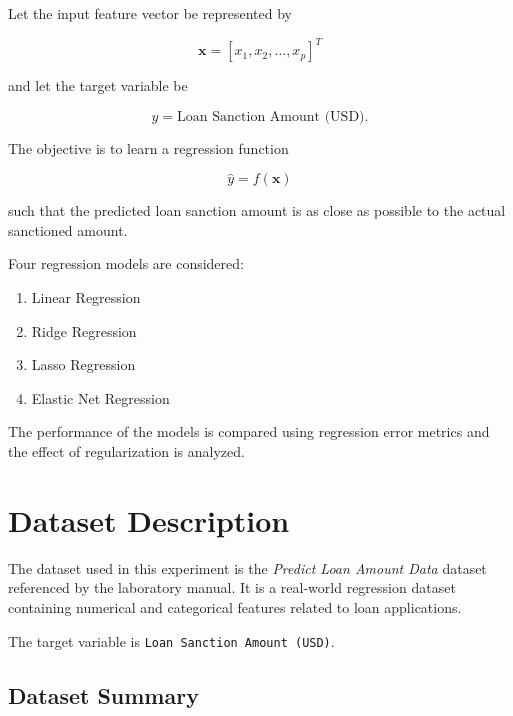 \documentclass[12pt,a4paper]{article}
\begin{document}
Let the input feature vector be represented by

\[
\mathbf{x} =
[x_1,x_2,\ldots,x_p]^T
\]

and let the target variable be

\[
y = \text{Loan Sanction Amount (USD)}.
\]

The objective is to learn a regression function

\[
\hat{y}=f(\mathbf{x})
\]

such that the predicted loan sanction amount is as close as possible to
the actual sanctioned amount.

Four regression models are considered:

\begin{enumerate}
    \item Linear Regression
    \item Ridge Regression
    \item Lasso Regression
    \item Elastic Net Regression
\end{enumerate}

The performance of the models is compared using regression error metrics
and the effect of regularization is analyzed.


\section{Dataset Description}

The dataset used in this experiment is the \textit{Predict Loan Amount
Data} dataset referenced by the laboratory manual. It is a real-world
regression dataset containing numerical and categorical features related
to loan applications.

The target variable is \texttt{Loan Sanction Amount (USD)}.

\subsection{Dataset Summary}
\end{document}
